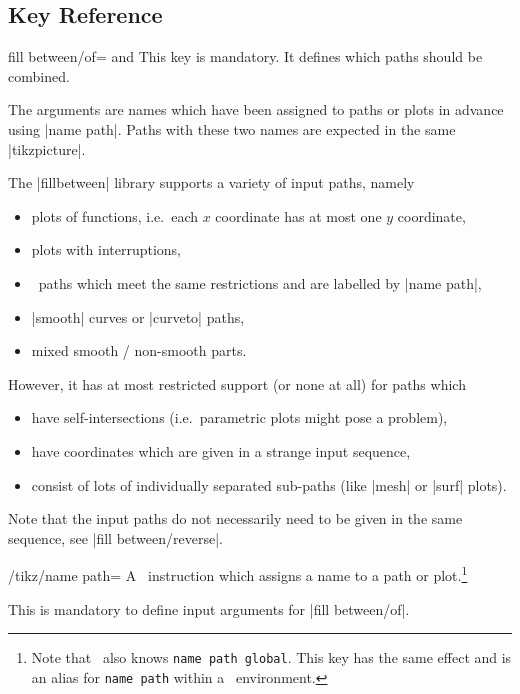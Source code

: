 \subsection{Key Reference}

\begin{tikzkey}{fill between/of= and }
	This key is mandatory. It defines which paths should be combined.

	The arguments are names which have been assigned to paths or plots in advance using |name path|. Paths with these two names are expected in the same |tikzpicture|.

	The |fillbetween| library supports a variety of input paths, namely
	\begin{itemize}
		\item plots of functions, i.e.\ each $x$ coordinate has at most one $y$ coordinate,
		\item plots with interruptions,
		\item \Tikz\ paths which meet the same restrictions and are labelled by |name path|,
		\item |smooth| curves or |curveto| paths,
		\item mixed smooth / non-smooth parts.
	\end{itemize}
	However, it has at most restricted support (or none at all) for paths which
	\begin{itemize}
		\item have self-intersections (i.e.\ parametric plots might pose a problem),
		\item have coordinates which are given in a strange input sequence,
		\item consist of lots of individually separated sub-paths (like |mesh| or |surf| plots).
	\end{itemize}

	Note that the input paths do not necessarily need to be given in the same sequence, see |fill between/reverse|.
\end{tikzkey}

\begin{key}{/tikz/name path=}
	A \Tikz\ instruction which assigns a name to a path or plot.\footnote{Note that \tikzname\ also knows \texttt{name path global}. This key has the same effect and is an alias for \texttt{name path} within a \PGFPlots\ environment.}

	This is mandatory to define input arguments for |fill between/of|.
\end{key}

